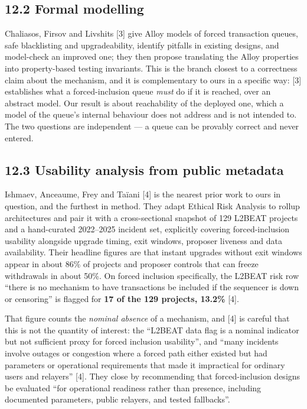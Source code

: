 \documentclass[conference]{IEEEtran}
\renewcommand{\_}{\textunderscore\allowbreak}
\begin{document}
\subsection{12.2 Formal modelling}\label{formal-modelling}

Chaliasos, Firsov and Livshits {[}3{]} give Alloy models of forced
transaction queues, safe blacklisting and upgradeability, identify
pitfalls in existing designs, and model-check an improved one; they then
propose translating the Alloy properties into property-based testing
invariants. This is the branch closest to a correctness claim about the
mechanism, and it is complementary to ours in a specific way: {[}3{]}
establishes what a forced-inclusion queue \emph{must} do if it is
reached, over an abstract model. Our result is about reachability of the
deployed one, which a model of the queue's internal behaviour does not
address and is not intended to. The two questions are independent --- a
queue can be provably correct and never entered.

\subsection{12.3 Usability analysis from public
metadata}\label{usability-analysis-from-public-metadata}

Ishmaev, Anceaume, Frey and Taïani {[}4{]} is the nearest prior work to
ours in question, and the furthest in method. They adapt Ethical Risk
Analysis to rollup architectures and pair it with a cross-sectional
snapshot of 129 L2BEAT projects and a hand-curated 2022--2025 incident
set, explicitly covering forced-inclusion usability alongside upgrade
timing, exit windows, proposer liveness and data availability. Their
headline figures are that instant upgrades without exit windows appear
in about 86\% of projects and proposer controls that can freeze
withdrawals in about 50\%. On forced inclusion specifically, the L2BEAT
risk row ``there is no mechanism to have transactions be included if the
sequencer is down or censoring'' is flagged for \textbf{17 of the 129
projects, 13.2\%} {[}4{]}.

That figure counts the \emph{nominal absence} of a mechanism, and
{[}4{]} is careful that this is not the quantity of interest: the
``L2BEAT data flag is a nominal indicator but not sufficient proxy for
forced inclusion usability'', and ``many incidents involve outages or
congestion where a forced path either existed but had parameters or
operational requirements that made it impractical for ordinary users and
relayers'' {[}4{]}. They close by recommending that forced-inclusion
designs be evaluated ``for operational readiness rather than presence,
including documented parameters, public relayers, and tested
fallbacks''.
\end{document}
